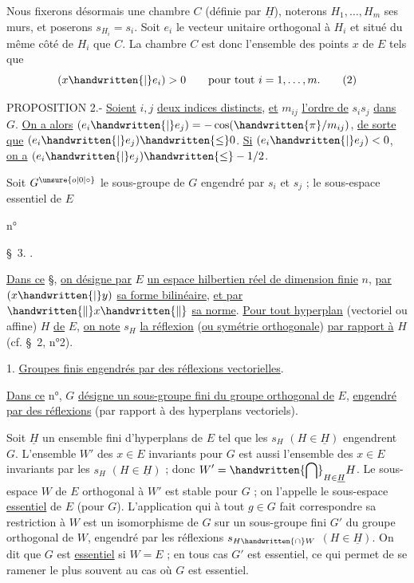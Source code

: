 Nous fixerons désormais une chambre $C$ (définie par $\underline{H}$), noterons $H_1,\ldots,H_m$ ses murs, et poserons $s_{H_i}=s_i$. Soit $e_i$ le vecteur unitaire orthogonal à $H_i$ et situé du même côté de $H_i$ que $C$. La chambre $C$ est donc l'ensemble des points $x$ de $E$ tels que
\[
(x\handwritten{|}e_i)>0\qquad\text{pour tout }i=1,\ldots,m.
\tag*{(2)}
\]

PROPOSITION 2.- \uline{Soient} $i,j$ \uline{deux indices distincts}, \uline{et} $m_{ij}$ \uline{l'ordre de} $s_i s_j$ \uline{dans} $G$. \uline{On a alors} $(e_i\handwritten{|}e_j)=-\cos(\handwritten{\pi}/m_{ij})$, \uline{de sorte que} $(e_i\handwritten{|}e_j)\handwritten{\leq}0$. \uline{Si} $(e_i\handwritten{|}e_j)<0$, \uline{on a} $(e_i\handwritten{|}e_j)\handwritten{\leq}-1/2$.

Soit $G^{\unsure{o|0|\circ}}$ le sous-groupe de $G$ engendré par $s_i$ et $s_j$ ; le sous-espace essentiel de $E$

\begin{flushright}n° \end{flushright}
\begin{center}\S\ 3. .\end{center}

\uline{Dans ce} \S, \uline{on désigne par} $E$ \uline{un espace hilbertien réel de dimension finie} $n$, \uline{par} $(x\handwritten{|}y)$ \uline{sa forme bilinéaire}, \uline{et par} $\handwritten{\lVert}x\handwritten{\rVert}$ \uline{sa norme}. \uline{Pour tout hyperplan} (vectoriel ou affine) $H$ \uline{de} $E$, \uline{on note} $s_H$ \uline{la réflexion} (\uline{ou symétrie orthogonale}) \uline{par rapport à} $H$ (cf. \S\ 2, n°2).

1. \uline{Groupes finis engendrés par des réflexions vectorielles}.

\uline{Dans ce} n°, $G$ \uline{désigne un sous-groupe fini du groupe orthogonal de} $E$, \uline{engendré par des réflexions} (par rapport à des hyperplans vectoriels).

Soit $\underline{H}$ un ensemble fini d'hyperplans de $E$ tel que les $s_H$ $(H\in\underline{H})$ engendrent $G$. L'ensemble $W'$ des $x\in E$ invariants pour $G$ est aussi l'ensemble des $x\in E$ invariants par les $s_H$ $(H\in\underline{H})$ ; donc $\displaystyle W'=\handwritten{\bigcap}_{H\in\underline{H}}H$. Le sous-espace $W$ de $E$ orthogonal à $W'$ est stable pour $G$ ; on l'appelle le sous-espace \uline{essentiel} de $E$ (pour $G$). L'application qui à tout $g\in G$ fait correspondre sa restriction à $W$ est un isomorphisme de $G$ sur un sous-groupe fini $G'$ du groupe orthogonal de $W$, engendré par les réflexions $s_{H\handwritten{\cap}W}$ $(H\in\underline{H})$. On dit que $G$ est \uline{essentiel} si $W=E$ ; en tous cas $G'$ est essentiel, ce qui permet de se ramener le plus souvent au cas où $G$ est essentiel.


